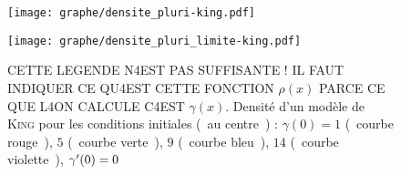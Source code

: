 
	\begin{figure}[ht!]
			\begin{minipage}[b]{0.40\linewidth}
				\centering \texttt{[image: graphe/densite\_pluri-king.pdf]}
			\end{minipage}\hfill
			\begin{minipage}[b]{0.48\linewidth}
				\centering \texttt{[image: graphe/densite\_pluri\_limite-king.pdf]}
			\end{minipage}
			\caption{CETTE LEGENDE N4EST PAS SUFFISANTE ! IL FAUT INDIQUER CE QU4EST CETTE FONCTION $\rho(x)$ PARCE CE QUE L4ON CALCULE C4EST $\gamma(x)$.
			Densité d'un modèle de \textsc{King} pour les conditions initiales
			(~au centre~) : $\gamma(0) = 1$ (~courbe rouge~), $5$ (~courbe verte~), $9$ (~courbe bleu~), $14$ (~courbe violette~), $\gamma'(0) = 0$}
			\label{King_Modele-test}
	\end{figure}

	
